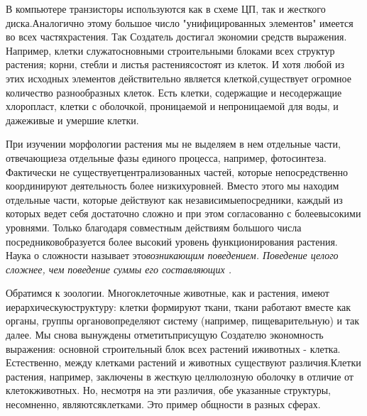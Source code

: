 \documentclass[11pt]{article}
\begin{document}
В компьютере транзисторы используются как в схеме ЦП, так и жесткого диска.\linebreak Аналогично этому большое число "унифицированных элементов" имеется во всех частях\linebreak растения. Так Создатель достигал экономии средств выражения. Например, клетки служат\linebreak основными строительными блоками всех структур растения; корни, стебли и листья растения\linebreak состоят из клеток. И хотя любой из этих исходных элементов действительно является клеткой,\linebreak существует огромное количество разнообразных клеток. Есть клетки, содержащие и не\linebreak содержащие хлоропласт, клетки с оболочкой, проницаемой и непроницаемой для воды, и даже\linebreak живые и умершие клетки. \bigskip 

При изучении морфологии растения мы не выделяем в нем отдельные части, отвечающие\linebreak за отдельные фазы единого процесса, например, фотосинтеза. Фактически не существует\linebreak централизованных частей, которые непосредственно координируют деятельность более низких\linebreak уровней. Вместо этого мы находим отдельные части, которые действуют как независимые\linebreak посредники, каждый из которых ведет себя достаточно сложно и при этом согласованно с более\linebreak высокими уровнями. Только благодаря совместным действиям большого числа посредников\linebreak образуется более высокий уровень функционирования растения. Наука о сложности называет это\linebreak \it возникающим поведением. \rm Поведение целого сложнее, чем поведение суммы его составляющих \cite{n6}. \bigskip 

Обратимся к зоологии. Многоклеточные животные, как и растения, имеют иерархическую\linebreak структуру: клетки формируют ткани, ткани работают вместе как органы, группы органов\linebreak определяют систему (например, пищеварительную) и так далее. Мы снова вынуждены отметить\linebreak присущую Создателю экономность выражения: основной строительный блок всех растений и\linebreak животных - клетка. Естественно, между клетками растений и животных существуют различия.\linebreak Клетки растения, например, заключены в жесткую целлюлозную оболочку в отличие от клеток\linebreak животных. Но, несмотря на эти различия, обе указанные структуры, несомненно, являются\linebreak клетками. Это пример общности в разных сферах. \bigskip 
\end{document}

